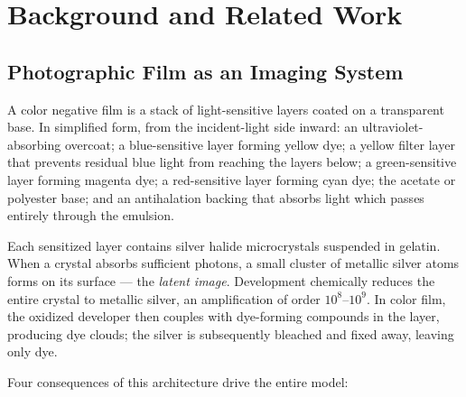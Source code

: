 \section{Background and Related Work}
\label{sec:background}

\subsection{Photographic Film as an Imaging System}

A color negative film is a stack of light-sensitive layers coated on a
transparent base. In simplified form, from the incident-light side inward:
an ultraviolet-absorbing overcoat; a blue-sensitive layer forming yellow dye; a
yellow filter layer that prevents residual blue light from reaching the layers
below; a green-sensitive layer forming magenta dye; a red-sensitive layer
forming cyan dye; the acetate or polyester base; and an antihalation backing
that absorbs light which passes entirely through the emulsion.

Each sensitized layer contains silver halide microcrystals suspended in
gelatin. When a crystal absorbs sufficient photons, a small cluster of metallic
silver atoms forms on its surface --- the \emph{latent image}. Development
chemically reduces the entire crystal to metallic silver, an amplification of
order $10^8$--$10^9$. In color film, the oxidized developer then couples with
dye-forming compounds in the layer, producing dye clouds; the silver is
subsequently bleached and fixed away, leaving only dye.

Four consequences of this architecture drive the entire \EM{} model:

